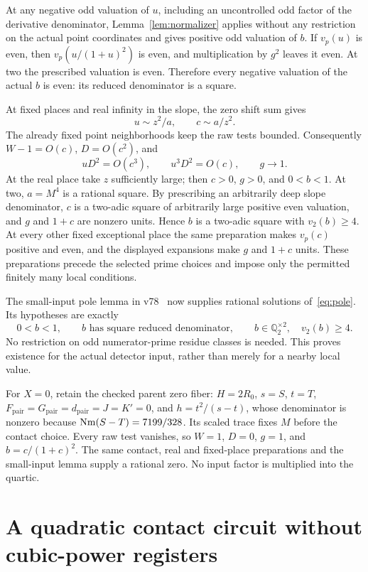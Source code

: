 \documentclass[11pt,a4paper]{article}
\newcommand{\Q}{\mathbb Q}\newcommand{\Z}{\mathbb Z}
\begin{document}
At any negative odd valuation of $u$, including an uncontrolled odd
factor of the derivative denominator, Lemma~\ref{lem:normalizer} applies
without any restriction on the actual point coordinates and gives
positive odd valuation of $b$. If $v_p(u)$ is even, then
$v_p(u/(1+u)^2)$ is even, and multiplication by $g^2$ leaves it even.
At two the prescribed valuation is even. Therefore every negative
valuation of the actual $b$ is even: its reduced denominator is a square.

At fixed places and real infinity in the slope, the zero shift sum gives
\[
 u\sim z^2/a,\qquad c\sim a/z^2.
\]
The already fixed point neighborhoods keep the raw tests bounded.
Consequently $W-1=O(c)$, $D=O(c^2)$, and
\[
 uD^2=O(c^3),\qquad u^3D^2=O(c),\qquad g\longrightarrow1.
\]
At the real place take $z$ sufficiently large; then $c>0$, $g>0$,
and $0<b<1$. At two, $a=M^4$ is a rational square. By prescribing
an arbitrarily deep slope denominator, $c$ is a two-adic square of
arbitrarily large positive even valuation, and $g$ and $1+c$ are
nonzero units. Hence $b$ is a two-adic square with $v_2(b)\ge4$.
At every other fixed exceptional place the same preparation makes
$v_p(c)$ positive and even, and the displayed expansions make $g$
and $1+c$ units. These preparations precede the selected prime choices
and impose only the permitted finitely many local conditions.

The small-input pole lemma in v78~\cite{v78} now supplies rational
solutions of~\eqref{eq:pole}. Its hypotheses are exactly
\[
 0<b<1,\qquad b\text{ has square reduced denominator},\qquad
 b\in\Q_2^{\times2},\quad v_2(b)\ge4.
\]
No restriction on odd numerator-prime residue classes is needed.
This proves existence for the actual detector input, rather than merely
for a nearby local value.

For $X=0$, retain the checked parent zero fiber: $H=2R_0$,
$s=S$, $t=T$, $F_{\mathrm{pair}}=G_{\mathrm{pair}}=d_{
\mathrm{pair}}=J=K'=0$, and
$h=t^2/(s-t)$, whose denominator is nonzero because
$\operatorname{Nm}(S-T)=7199/328$. Its scaled trace fixes $M$ before the contact
choice. Every raw test vanishes, so $W=1$, $D=0$, $g=1$, and
$b=c/(1+c)^2$. The same contact, real and fixed-place preparations
and the small-input lemma supply a rational zero. No input factor is
multiplied into the quartic.

\section{A quadratic contact circuit without cubic-power registers}
\end{document}
